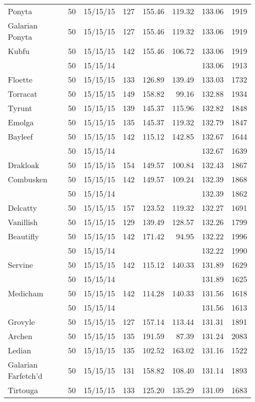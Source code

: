 \begin{longtable}{lrrrrrrr}
Ponyta & 50 & 15/15/15 & 127 & 155.46 & 119.32 & 133.06 & 1919\\
Galarian Ponyta & 50 & 15/15/15 & 127 & 155.46 & 119.32 & 133.06 & 1919\\
Kubfu & 50 & 15/15/15 & 142 & 155.46 & 106.72 & 133.06 & 1919\\
 & 50 & 15/15/14 & & & & 133.06 & 1913\\
Floette & 50 & 15/15/15 & 133 & 126.89 & 139.49 & 133.03 & 1732\\
Torracat & 50 & 15/15/15 & 149 & 158.82 & 99.16 & 132.88 & 1934\\
Tyrunt & 50 & 15/15/15 & 139 & 145.37 & 115.96 & 132.82 & 1848\\
Emolga & 50 & 15/15/15 & 135 & 145.37 & 119.32 & 132.79 & 1847\\
Bayleef & 50 & 15/15/15 & 142 & 115.12 & 142.85 & 132.67 & 1644\\
 & 50 & 15/15/14 & & & & 132.67 & 1639\\
Drakloak & 50 & 15/15/15 & 154 & 149.57 & 100.84 & 132.43 & 1867\\
Combusken & 50 & 15/15/15 & 142 & 149.57 & 109.24 & 132.39 & 1868\\
 & 50 & 15/15/14 & & & & 132.39 & 1862\\
Delcatty & 50 & 15/15/15 & 157 & 123.52 & 119.32 & 132.27 & 1691\\
Vanillish & 50 & 15/15/15 & 129 & 139.49 & 128.57 & 132.26 & 1799\\
Beautifly & 50 & 15/15/15 & 142 & 171.42 & 94.95 & 132.22 & 1996\\
 & 50 & 15/15/14 & & & & 132.22 & 1990\\
Servine & 50 & 15/15/15 & 142 & 115.12 & 140.33 & 131.89 & 1629\\
 & 50 & 15/15/14 & & & & 131.89 & 1625\\
Medicham & 50 & 15/15/15 & 142 & 114.28 & 140.33 & 131.56 & 1618\\
 & 50 & 15/15/14 & & & & 131.56 & 1613\\
Grovyle & 50 & 15/15/15 & 127 & 157.14 & 113.44 & 131.31 & 1891\\
Archen & 50 & 15/15/15 & 135 & 191.59 & 87.39 & 131.24 & 2083\\
Ledian & 50 & 15/15/15 & 135 & 102.52 & 163.02 & 131.16 & 1522\\
Galarian Farfetch'd & 50 & 15/15/15 & 131 & 158.82 & 108.40 & 131.14 & 1893\\
Tirtouga & 50 & 15/15/15 & 133 & 125.20 & 135.29 & 131.09 & 1683\\

\end{longtable}
